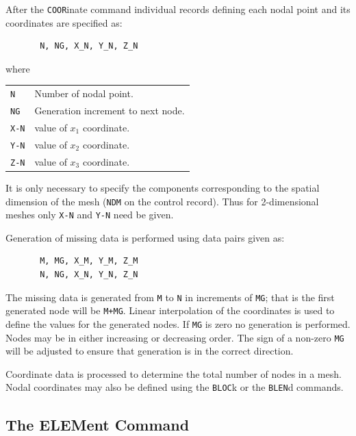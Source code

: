 After the {\tt COOR}inate command individual records defining each nodal point
and its coordinates are specified as:
\begin{verbatim}
       N, NG, X_N, Y_N, Z_N
\end{verbatim}
where
\begin{center}
\begin{tabular}{ l l }
{\tt N  } & Number of nodal point. \\
{\tt NG } & Generation increment to next node. \\
{\tt X-N} & value of $x_1$ coordinate. \\
{\tt Y-N} & value of $x_2$ coordinate. \\
{\tt Z-N} & value of $x_3$ coordinate. \\
\end{tabular}
\end{center}
It is only necessary to specify the components corresponding to the
spatial dimension of the mesh ({\tt NDM} on the control record).
Thus for 2-dimensional meshes only {\tt X-N} and {\tt Y-N} need be given.

Generation of missing data is performed using data pairs given as:
\begin{verbatim}
       M, MG, X_M, Y_M, Z_M
       N, NG, X_N, Y_N, Z_N
\end{verbatim}
The missing data is generated from {\tt M} to {\tt N} in increments of
{\tt MG}; that is the first generated node will be {\tt M+MG}.  Linear
interpolation of the coordinates is used to define the values for the
generated nodes.  If {\tt MG} is zero no generation is performed.
Nodes may be in either increasing or decreasing order.  The sign
of a non-zero {\tt MG} will be adjusted to ensure that generation is
in the correct direction.

Coordinate data is processed to determine the total number of nodes in a
mesh.
Nodal coordinates may also be defined using the {\tt BLOC}k
or the {\tt BLEN}d commands.

\subsection{The ELEMent Command}
\label{elem}

